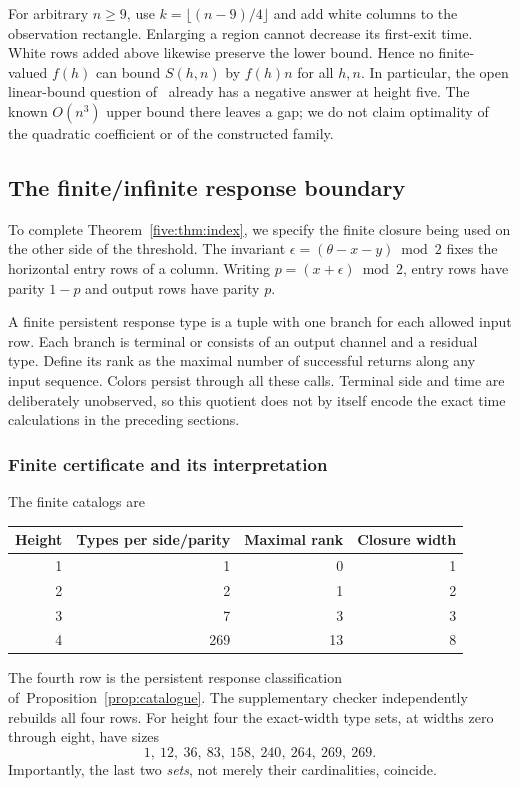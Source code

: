 For arbitrary $n\ge9$, use $k=\lfloor(n-9)/4\rfloor$ and add white columns to
the observation rectangle. Enlarging a region cannot decrease its first-exit
time. White rows added above likewise preserve the lower bound. Hence no
finite-valued $f(h)$ can bound $S(h,n)$ by $f(h)n$ for all $h,n$. In particular,
the open linear-bound question of~\cite{etse} already has a negative answer at
height five. The known $O(n^3)$ upper bound there leaves a gap; we do not
claim optimality of the quadratic coefficient or of the constructed family.

\subsection{The finite/infinite response boundary}
To complete Theorem~\ref{five:thm:index}, we specify the finite closure being used
on the other side of the threshold. The invariant
$\epsilon=(\theta-x-y)\bmod2$ fixes the horizontal entry rows of a column.
Writing $p=(x+\epsilon)\bmod2$, entry rows have parity $1-p$ and output rows
have parity $p$.

A finite persistent response type is a tuple with one branch for each allowed
input row. Each branch is terminal or consists of an output channel and a
residual type. Define its rank as the maximal number of successful returns
along any input sequence. Colors persist through all these calls. Terminal
side and time are deliberately unobserved, so this quotient does not by itself
encode the exact time calculations in the preceding sections.

\subsubsection{Finite certificate and its interpretation}
The finite catalogs are
\begin{center}
\begin{tabular}{@{}rrrr@{}}\toprule
Height & Types per side/parity & Maximal rank & Closure width\\\midrule
1&1&0&1\\2&2&1&2\\3&7&3&3\\4&269&13&8\\\bottomrule
\end{tabular}
\end{center}
The fourth row is the persistent response classification of~Proposition~\ref{prop:catalogue}.
The supplementary checker independently rebuilds all four rows. For height
four the exact-width type sets, at widths zero through eight, have sizes
\[1,\ 12,\ 36,\ 83,\ 158,\ 240,\ 264,\ 269,\ 269.\]
Importantly, the last two \emph{sets}, not merely their cardinalities, coincide.

